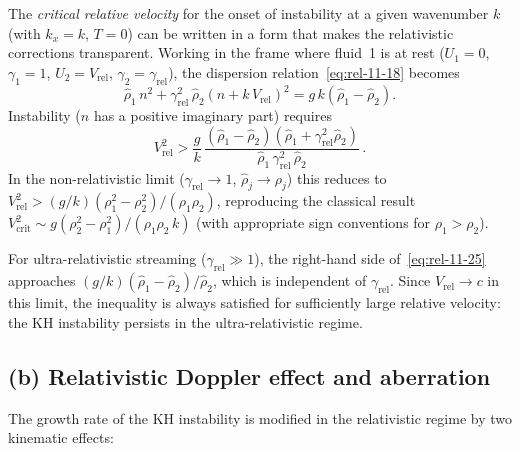 The \emph{critical relative velocity} for the onset of instability at
a given wavenumber $k$ (with $k_x = k$, $T = 0$) can be written in
a form that makes the relativistic corrections transparent.
Working in the frame where fluid~1 is at rest ($U_1 = 0$,
$\gamma_1 = 1$, $U_2 = V_{\mathrm{rel}}$, $\gamma_2 = \gamma_{\mathrm{rel}}$),
the dispersion relation~\eqref{eq:rel-11-18} becomes
\begin{equation}\label{eq:rel-11-24}
  \hat{\rho}_1\, n^{2}
  + \gamma_{\mathrm{rel}}^{2}\,\hat{\rho}_2
  \!\left(n + k\, V_{\mathrm{rel}}\right)^{2}
  = g\,k\!\left(\hat{\rho}_1 - \hat{\rho}_2\right).
\end{equation}
Instability ($n$ has a positive imaginary part) requires
\begin{equation}\label{eq:rel-11-25}
  \boxed{\;
  V_{\mathrm{rel}}^{2}
  > \frac{g}{k}\,
  \frac{(\hat{\rho}_1 - \hat{\rho}_2)
  (\hat{\rho}_1 + \gamma_{\mathrm{rel}}^{2}\hat{\rho}_2)}
  {\hat{\rho}_1\,\gamma_{\mathrm{rel}}^{2}\,\hat{\rho}_2}\,.
  \;}
\end{equation}
In the non-relativistic limit ($\gamma_{\mathrm{rel}} \to 1$,
$\hat{\rho}_j \to \rho_j$) this reduces to
$V_{\mathrm{rel}}^{2} > (g/k)(\rho_1^{2} - \rho_2^{2})/(\rho_1\rho_2)$,
reproducing the classical result
$V_{\mathrm{crit}}^{2} \sim g(\rho_2^{2}-\rho_1^{2})/(\rho_1\rho_2\, k)$
(with appropriate sign conventions for $\rho_1 > \rho_2$).

For ultra-relativistic streaming ($\gamma_{\mathrm{rel}} \gg 1$),
the right-hand side of~\eqref{eq:rel-11-25} approaches
$(g/k)(\hat{\rho}_1 - \hat{\rho}_2)/\hat{\rho}_2$, which is
independent of $\gamma_{\mathrm{rel}}$.  Since $V_{\mathrm{rel}} \to c$
in this limit, the inequality is always satisfied for sufficiently
large relative velocity: the KH instability persists in the
ultra-relativistic regime.

\subsection*{(b) Relativistic Doppler effect and aberration}

The growth rate of the KH instability is modified in the relativistic
regime by two kinematic effects:


